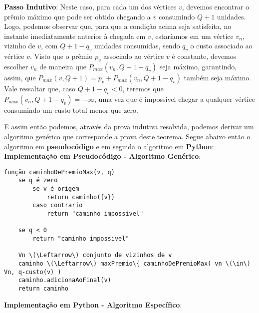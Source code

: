 \documentclass{article}
\begin{document}
\textbf{Passo Indutivo}: Neste caso, para cada um dos vértices $v$, devemos encontrar o prêmio máximo que pode ser obtido chegando a $v$ consumindo $Q+1$ unidades. Logo, podemos observar que, para que a condição acima seja satisfeita, no instante imediatamente anterior à chegada em $v$, estaríamos em um vértice $v_n$, vizinho de $v$, com $Q+1-q_v$ unidades consumidas, sendo $q_v$ o custo associado ao vértice $v$. Visto que o prêmio $p_v$ associado ao vértice $v$ é constante, devemos escolher $v_n$ de maneira que $P_{max}(v_n,Q+1-q_v)$ seja máximo, garantindo, assim, que $P_{max}(v,Q+1) = p_v + P_{max}(v_n,Q+1-q_v)$ também seja máximo. Vale ressaltar que, caso $Q+1-q_v < 0$, teremos que $P_{max}(v_n,Q+1-q_v) = -\infty$, uma vez que é impossivel chegar a qualquer vértice consumindo um custo total menor que zero.

\pagebreak

E assim então podemos, através da prova indutiva resolvida, podemos derivar um algoritmo genérico que corresponde a prova deste teorema. Segue abaixo então o algoritmo em \textbf{pseudocódigo} e em seguida o algoritmo em \textbf{Python}:\\

\textbf{Implementação em Pseudocódigo - Algoritmo Genérico}:

{\color{ogreen}
\begin{verbatim}
função caminhoDePremioMax(v, q)
    se q é zero
        se v é origem
            return caminho({v})
        caso contrario
            return "caminho impossivel"

    se q < 0
        return "caminho impossivel"

    Vn \(\Leftarrow\) conjunto de vizinhos de v
    caminho \(\Leftarrow\) maxPremio\{ caminhoDePremioMax( vn \(\in\) Vn, q-custo(v) )
    caminho.adicionaAoFinal(v)
    return caminho
\end{verbatim}
}

\textbf{Implementação em Python - Algoritmo Específico}:
\end{document}
